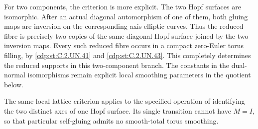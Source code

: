 \begin{proposition}
For two components, the criterion is more explicit.
The two Hopf surfaces are isomorphic. After an actual
diagonal automorphism of one of them, both gluing maps
are inversion on the corresponding axis elliptic curves.
Thus the reduced fibre is precisely two copies of the
same diagonal Hopf surface joined by the two inversion
maps. Every such reduced fibre occurs in a compact
zero-Euler torus filling, by \ref{cdp:st:C.2.UN.41} and \ref{cdp:st:C.2.UN.43}.
This completely determines the reduced supports in
this two-component branch. The constants in the
dual-normal isomorphisms remain explicit local
smoothing parameters in the quotient below.

The same local lattice criterion applies to the
specified operation of identifying the two distinct
axes of one Hopf surface. Its single transition
cannot have $M=I$, so that particular self-gluing
admits no smooth-total torus smoothing.
\end{proposition}

